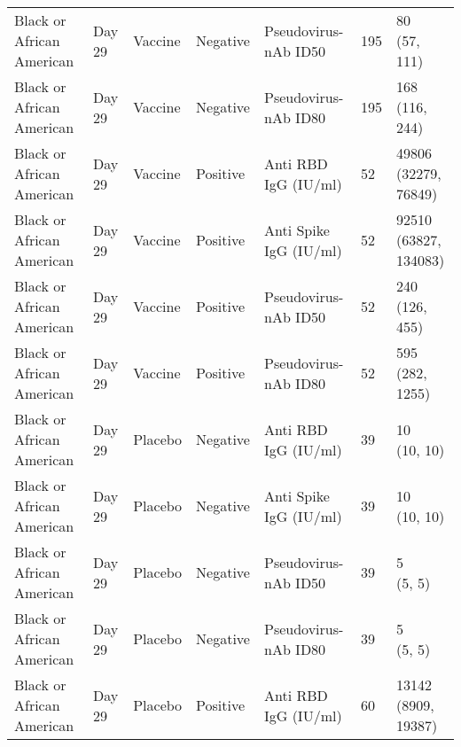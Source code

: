 \documentclass[]{book}
\theoremstyle{definition}
\theoremstyle{definition}
\theoremstyle{definition}
\newcommand{\1}{\mathbbm{1}}
\begin{document}
\begin{landscape}
\begin{ThreePartTable}
\begin{longtable}[t]{>{\raggedright\arraybackslash}p{7cm}llllll}
\hspace{1em}Black or African American & Day 29 & Vaccine & Negative & Pseudovirus-nAb ID50 & 195 & \makecell[l]{80\\(57, 111)}\\
\hspace{1em}Black or African American & Day 29 & Vaccine & Negative & Pseudovirus-nAb ID80 & 195 & \makecell[l]{168\\(116, 244)}\\
\hspace{1em}Black or African American & Day 29 & Vaccine & Positive & Anti RBD IgG (IU/ml) & 52 & \makecell[l]{49806\\(32279, 76849)}\\
\hspace{1em}Black or African American & Day 29 & Vaccine & Positive & Anti Spike IgG (IU/ml) & 52 & \makecell[l]{92510\\(63827, 134083)}\\
\hspace{1em}Black or African American & Day 29 & Vaccine & Positive & Pseudovirus-nAb ID50 & 52 & \makecell[l]{240\\(126, 455)}\\
\hspace{1em}Black or African American & Day 29 & Vaccine & Positive & Pseudovirus-nAb ID80 & 52 & \makecell[l]{595\\(282, 1255)}\\
\hspace{1em}Black or African American & Day 29 & Placebo & Negative & Anti RBD IgG (IU/ml) & 39 & \makecell[l]{10\\(10, 10)}\\
\hspace{1em}Black or African American & Day 29 & Placebo & Negative & Anti Spike IgG (IU/ml) & 39 & \makecell[l]{10\\(10, 10)}\\
\hspace{1em}Black or African American & Day 29 & Placebo & Negative & Pseudovirus-nAb ID50 & 39 & \makecell[l]{5\\(5, 5)}\\
\hspace{1em}Black or African American & Day 29 & Placebo & Negative & Pseudovirus-nAb ID80 & 39 & \makecell[l]{5\\(5, 5)}\\
\hspace{1em}Black or African American & Day 29 & Placebo & Positive & Anti RBD IgG (IU/ml) & 60 & \makecell[l]{13142\\(8909, 19387)}\\

\end{longtable}
\end{ThreePartTable}
\end{landscape}
\end{document}
